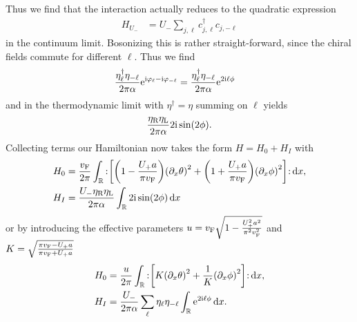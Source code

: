 \documentclass[english, parskip=full]{scrartcl}
\begin{document}
Thus we find that the interaction actually reduces to the quadratic expression 
\begin{align}
H_{U_-} &= U_- \sum_{j,\ell} c_{j,\ell}^\dagger c_{j,-\ell}
\end{align}
in the continuum limit.
Bosonizing this is rather straight-forward, since the chiral fields commute for different $\ell$.
Thus we find
\begin{align}
\frac{\eta_\ell^\dagger \eta_{-\ell}}{2\pi\alpha} \text{e}^{\text{i}\varphi_\ell - \text{i}\varphi_{-\ell}} &= \frac{\eta_\ell^\dagger \eta_{-\ell}}{2\pi\alpha} \text{e}^{2\text{i}\ell \phi}
\end{align}
and in the thermodynamic limit with $\eta^\dagger=\eta$ summing on $\ell$ yields
\begin{align}
\frac{\eta_{\text{R}} \eta_{\text{L}}}{2\pi\alpha} 2\text{i}\sin(2\phi).
\end{align}
Collecting terms our Hamiltonian now takes the form $H=H_0+H_I$ with
\begin{align}
H_0 &= \frac{\vf}{2\pi} \intr{\normord{\klb*{\kla*{1 - \frac{U_+a}{\pi\vf}} \kla*{\partial_x\theta}^2 + \kla*{1 + \frac{U_+a}{\pi\vf}} \kla*{\partial_x\phi}^2  }}}{x},\\
H_I &= \frac{U_- \eta_\R\eta_\L}{2\pi\alpha} \intr{2\i\sin(2\phi)}{x}
\end{align}
or by introducing the effective parameters $u = v_{\text{F}}\sqrt{1 - \frac{U_+^2a^2}{\pi^2v_{\text{F}}^2}}$ and $K = \sqrt{\frac{\pi v_{\text{F}} - U_+a}{\pi v_{\text{F}} + U_+a}}$
\begin{align}
H_0 &= \frac{u}{2\pi} \intr{\normord{\klb*{K\kla*{\partial_x\theta}^2 + \frac{1}{K} \kla*{\partial_x\phi}^2}}}{x},\\
H_I &= \frac{U_-}{2\pi\alpha} \sum_\ell \eta_{\ell}\eta_{-\ell} \intr{\powe{2\i\ell \phi}}{x}.
\end{align}
\end{document}

